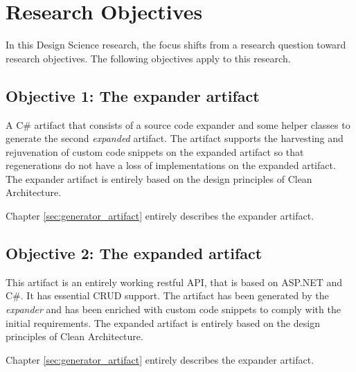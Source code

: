 \section{Research Objectives} \label{sec:research_objectives}

In this Design Science research, the focus shifts from a research question toward
research objectives. The following objectives apply to this research.

\subsection*{Objective 1: The expander artifact}
A C\# artifact that consists of a source code expander and some helper classes to
generate the second \emph{expanded} artifact. The artifact supports the harvesting and
rejuvenation of custom code snippets on the expanded artifact so that regenerations do not
have a loss of implementations on the expanded artifact. The expander artifact is entirely
based on the design principles of Clean Architecture.

Chapter \ref{sec:generator_artifact} entirely describes the expander artifact.

\subsection*{Objective 2: The expanded artifact}
This artifact is an entirely working restful API, that is based on ASP.NET and C\#. It has
essential CRUD support. The artifact has been generated by the \emph{expander} and has
been enriched with custom code snippets to comply with the initial requirements.
The expanded artifact is entirely based on the design principles of Clean Architecture.

Chapter \ref{sec:generator_artifact} entirely describes the expander artifact.


